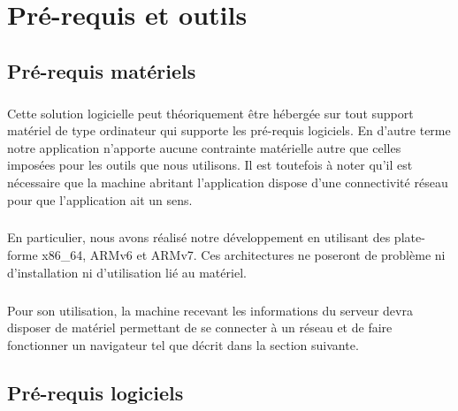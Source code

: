 \chapter{Pré-requis et outils}

\section{Pré-requis matériels}
    \paragraph{}
        Cette solution logicielle peut théoriquement être hébergée sur tout
        support matériel de type ordinateur qui supporte les pré-requis
        logiciels.
        En d'autre terme notre application n'apporte aucune contrainte
        matérielle autre que celles imposées pour les outils que nous
        utilisons.
        Il est toutefois à noter qu'il est nécessaire que la machine abritant
        l'application dispose d'une connectivité réseau pour que l'application
        ait un sens.
    \paragraph{}
        En particulier, nous avons réalisé notre développement en utilisant des plate-forme x86\_64, ARMv6 et ARMv7. Ces architectures ne poseront de problème ni d'installation ni d'utilisation lié au matériel.

    \paragraph{}
        Pour son utilisation, la machine recevant les informations du serveur
        devra disposer de matériel permettant de se connecter à un réseau et
        de faire fonctionner un navigateur tel que décrit dans la section
        suivante.

\section{Pré-requis logiciels}
